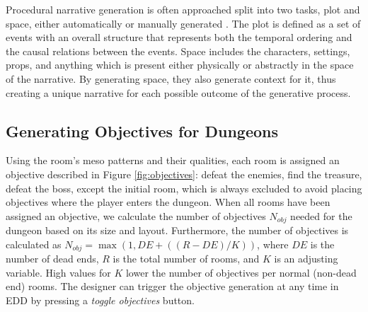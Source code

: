 Procedural narrative generation is often approached split into two tasks, plot and space, either automatically or manually generated \cite{p7kybartas2016survey,dormans2011generating,abuzuraiq2019-taksim,Hartsook2011TowardWorlds}. The plot is defined as a set of events with an overall structure that represents both the temporal ordering and the causal relations between the events. Space includes the characters, settings, props, and anything which is present either physically or abstractly in the space of the narrative. By generating space, they also generate context for it, thus creating a unique narrative for each possible outcome of the generative process.

\subsection{Generating Objectives for Dungeons} \label{sec:approach}

Using the room's meso patterns and their qualities, each room is assigned an objective described in Figure \ref{fig:objectives}: defeat the enemies, find the treasure, defeat the boss, except the initial room, which is always excluded to avoid placing objectives where the player enters the dungeon. When all rooms have been assigned an objective, we calculate the number of objectives $N_{obj}$ needed for the dungeon based on its size and layout. Furthermore, the number of objectives is calculated as $N_{obj} = \max(1, DE + ((R-DE)/K))$, where $DE$ is the number of dead ends, $R$ is the total number of rooms, and $K$ is an adjusting variable. High values for $K$ lower the number of objectives per normal (non-dead end) rooms. The designer can trigger the objective generation at any time in EDD by pressing a \textit{toggle objectives} button.%

